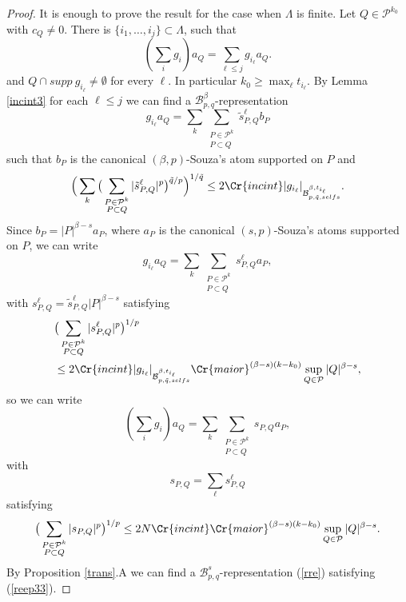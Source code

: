 \documentclass{amsart}
\theoremstyle{definition}
\newcommand{\Crr}[1]{\Cr{#1}}
\begin{document}
\begin{proof} It is enough to prove the result for the case when  $\Lambda$ is finite. Let $Q\in \mathcal{P}^{k_0}$ with $c_Q\neq 0$.  There is   $\{i_1,
\dots, i_j\}\subset \Lambda$,  such that   
\begin{equation}\label{aa1} (\sum_i g_i ) a_Q=  \sum_{\ell\leq j} g_{i_\ell} a_Q.\end{equation} 
and $Q\cap supp \ g_{i_\ell} \neq \emptyset$ for every $\ell$. In particular $k_0\geq \max_\ell t_{i_\ell}.$
By Lemma \ref{incint3} for each $\ell\leq j$ we can find a $\mathcal{B}^\beta_{p,q} $-representation 
\begin{equation}\label{hjk} g_{i_\ell}a_Q= \sum_k \sum_{\substack{ P\in \mathcal{P}^k \\ P\subset Q}} \tilde{s}_{P,Q}^\ell b_{P}\end{equation}
such that $b_P$ is the canonical $(\beta,p)$-Souza's atom supported on $P$ and 
$$\Big( \sum_k \big(  \sum_{\substack{ P\in \mathcal{P}^k \\ P\subset Q}}  |\tilde{s}_{P,Q}^\ell|^p   \big)^{\tilde{q}/p}  \Big)^{1/\tilde{q}}\leq 2\Crr{incint}  |g_{i_\ell}|_{\mathcal{B}^{\beta,t_{i_\ell}}_{p,\tilde{q},selfs}} .$$
Since $b_P= |P|^{\beta -s}  a_P$, where $a_P$ is the canonical $(s,p)$-Souza's atoms supported on $P$, we can write
$$g_{i_\ell}a_Q= \sum_k \sum_{\substack{ P\in \mathcal{P}^k \\ P\subset Q}} s_{P,Q}^\ell a_{P},$$
with $s_{P,Q}^\ell=\tilde{s}_{P,Q}^\ell|P|^{\beta -s}$ satisfying 
\begin{align*}
 &\big( \sum_{\substack{ P\in \mathcal{P}^k \\ P\subset Q}}  |s_{P,Q}^\ell|^p \big)^{1/p} \\
&\leq  2\Crr{incint}  |g_{i_\ell}|_{\mathcal{B}^{\beta,t_{i_\ell}}_{p,\tilde{q},selfs}}  \Crr{maior}^{(\beta-s)(k-k_0)} \sup_{Q\in \mathcal{P}}|Q|^{\beta-s},
\end{align*} 
so we can write
$$(\sum_i g_i ) a_Q=  \sum_k \sum_{\substack{ P\in \mathcal{P}^k \\ P\subset Q}} s_{P,Q} a_{P},$$
with 
$$s_{P,Q}=\sum_\ell s_{P,Q}^\ell$$
 satisfying 
$$\big( \sum_{\substack{ P\in \mathcal{P}^k \\ P\subset Q}}  |s_{P,Q}|^p \big)^{1/p} \leq  2 N \Crr{incint} \Crr{maior}^{(\beta-s)(k-k_0)} \sup_{Q\in \mathcal{P}}|Q|^{\beta-s}.$$
By Proposition \ref{trans}.A we can find a $\mathcal{B}^s_{p,q}$-representation (\ref{rre}) satisfying (\ref{reep33}). 
\end{proof}
\end{document}
